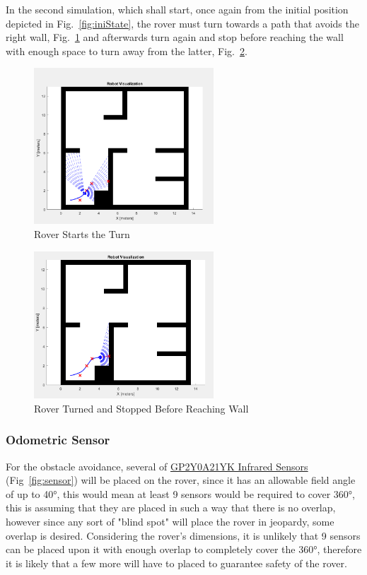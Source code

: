 In the second simulation, which shall start, once again from the initial position depicted in Fig.~\ref{fig:iniState}, the rover must turn towards a path that avoids the right wall, Fig.~\ref{fig:sim2Line} and afterwards turn again and stop before reaching the wall with enough space to turn away from the latter, Fig.~\ref{fig:sim3Line}.

\begin{figure}[!htbp]
\centering
       \includegraphics[page=1,width=0.6\textwidth]{img/turn2.png} 
\caption{Rover Starts the Turn}
\label{fig:sim2Line}
\end{figure}

\begin{figure}[!htbp]
\centering
       \includegraphics[page=1,width=0.6\textwidth]{img/turn3.png} 
\caption{Rover Turned and Stopped Before Reaching Wall}
\label{fig:sim3Line}
\end{figure}
\newpage

\subsubsection{Odometric Sensor} 
For the obstacle avoidance, several of \href{https://www.botnroll.com/pt/infravermelhos/158-sen-00242.html}{GP2Y0A21YK Infrared Sensors} (Fig~\ref{fig:sensor}) will be placed on the rover, since it has an allowable field angle of up to \ang{40}, this would mean at least 9 sensors would be required to cover \ang{360}, this is assuming that they are placed in such a way that there is no overlap, however since any sort of "blind spot" will place the rover in jeopardy, some overlap is desired. Considering the rover's dimensions, it is unlikely that 9 sensors can be placed upon it with enough overlap to completely cover the \ang{360}, therefore it is likely that a few more will have to placed to guarantee safety of the rover.


